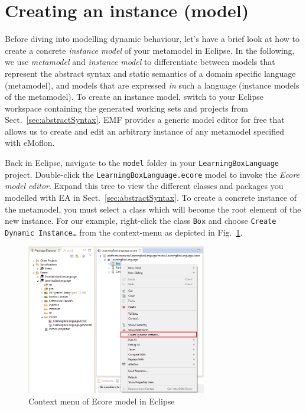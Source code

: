 \section{Creating an instance (model)}
\label{sect:instance}

Before diving into modelling dynamic behaviour, let's have a brief look at how to create a concrete \emph{instance model} of your metamodel in Eclipse.
In the following, we use \emph{metamodel} and \emph{instance model} to differentiate between models that represent the abstract syntax and static semantics of a domain specific language (metamodel), and models that are expressed \emph{in} such a language (instance models of the metamodel).
To create an instance model, switch to your Eclipse workspace containing the generated working sets and projects from Sect.~\ref{sec:abstractSyntax}.
EMF provides a generic model editor for free that allows us to create and edit an arbitrary instance of any metamodel specified with eMoflon.

Back in Eclipse, navigate to the \texttt{model} folder in your \texttt{LearningBoxLanguage} project.
Double-click the \texttt{LearningBoxLanguage.ecore} model to invoke  the \emph{Ecore model editor}.
Expand this tree to view the different classes and packages you modelled with EA in Sect.~\ref{sec:abstractSyntax}.
To create a concrete instance of the metamodel, you must select a class which will become the root element of the new instance.
For our example, right-click the class \texttt{Box} and choose \texttt{Create Dynamic Instance\ldots} from the context-menu as depicted in Fig.~\ref{fig:context_menu}.

\begin{figure}[htbp]
	\centering
  \includegraphics[width=0.7\textwidth]{pics/modelBrowserBilder/createInstance.png}
	\caption{Context menu of Ecore model in Eclipse}
	\label{fig:context_menu}
\end{figure}

